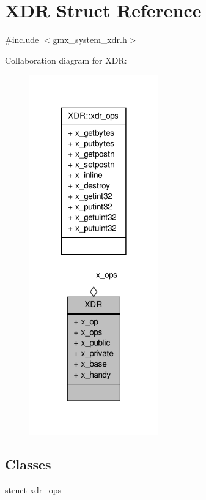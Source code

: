 \hypertarget{structXDR}{\section{\-X\-D\-R \-Struct \-Reference}
\label{structXDR}
}


{\ttfamily \#include $<$gmx\-\_\-system\-\_\-xdr.\-h$>$}



\-Collaboration diagram for \-X\-D\-R\-:
\nopagebreak
\begin{figure}[H]
\begin{center}
\leavevmode
\includegraphics[width=158pt]{structXDR__coll__graph}
\end{center}
\end{figure}
\subsection*{\-Classes}
\begin{DoxyCompactItemize}
\item 
struct \hyperlink{structXDR_1_1xdr__ops}{xdr\-\_\-ops}
\end{DoxyCompactItemize}
